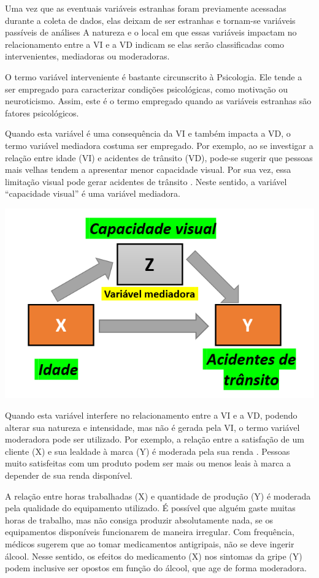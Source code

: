 \documentclass[
]{book}
\begin{document}
Uma vez que as eventuais variáveis estranhas foram previamente acessadas durante a coleta de dados, elas deixam de ser estranhas e tornam-se variáveis passíveis de análises A natureza e o local em que essas variáveis impactam no relacionamento entre a VI e a VD indicam se elas serão classificadas como intervenientes, mediadoras ou moderadoras.

O termo variável interveniente é bastante circunscrito à Psicologia. Ele tende a ser empregado para caracterizar condições psicológicas, como motivação ou neuroticismo. Assim, este é o termo empregado quando as variáveis estranhas são fatores psicológicos.

Quando esta variável é uma consequência da VI e também impacta a VD, o termo variável mediadora costuma ser empregado. Por exemplo, ao se investigar a relação entre idade (VI) e acidentes de trânsito (VD), pode-se sugerir que pessoas mais velhas tendem a apresentar menor capacidade visual. Por sua vez, essa limitação visual pode gerar acidentes de trânsito \citep{Rhodes2011}. Neste sentido, a variável ``capacidade visual'' é uma variável mediadora.

\includegraphics{./img/cap_mediacao.png}

Quando esta variável interfere no relacionamento entre a VI e a VD, podendo alterar sua natureza e intensidade, mas não é gerada pela VI, o termo variável moderadora pode ser utilizado. Por exemplo, a relação entre a satisfação de um cliente (X) e sua lealdade à marca (Y) é moderada pela sua renda \citep{Sugianto2017}. Pessoas muito satisfeitas com um produto podem ser mais ou menos leais à marca a depender de sua renda disponível.

A relação entre horas trabalhadas (X) e quantidade de produção (Y) é moderada pela qualidade do equipamento utilizado. É possível que alguém gaste muitas horas de trabalho, mas não consiga produzir absolutamente nada, se os equipamentos disponíveis funcionarem de maneira irregular. Com frequência, médicos sugerem que ao tomar medicamentos antigripais, não se deve ingerir álcool. Nesse sentido, os efeitos do medicamento (X) nos sintomas da gripe (Y) podem inclusive ser opostos em função do álcool, que age de forma moderadora.
\end{document}
